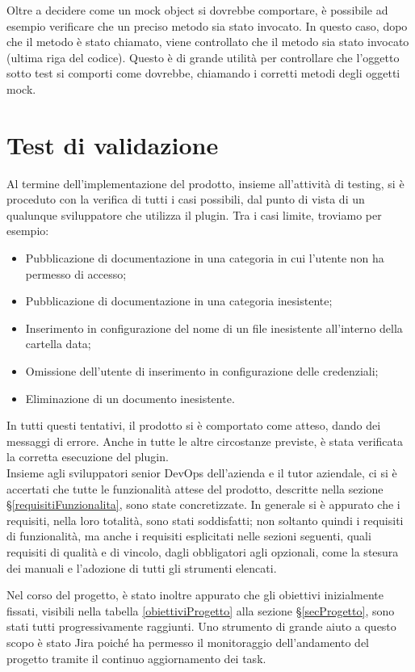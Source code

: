     Oltre a decidere come un mock object si dovrebbe comportare, è possibile ad esempio verificare che un preciso metodo sia stato invocato.
    In questo caso, dopo che il metodo  è stato chiamato, viene controllato che il metodo  sia stato invocato (ultima riga del codice).
    Questo è di grande utilità per controllare che l'oggetto sotto test si comporti come dovrebbe, chiamando i corretti metodi degli oggetti mock.


\section{Test di validazione}
Al termine dell'implementazione del prodotto, insieme all'attività di testing, si è proceduto con la verifica di tutti i casi possibili, dal punto di vista di un qualunque sviluppatore che utilizza il plugin.
Tra i casi limite, troviamo per esempio:
\begin{itemize}
    \item Pubblicazione di documentazione in una categoria in cui l'utente non ha permesso di accesso;
    \item Pubblicazione di documentazione in una categoria inesistente;
    \item Inserimento in configurazione del nome di un file inesistente all'interno della cartella data;
    \item Omissione dell'utente di inserimento in configurazione delle credenziali;
    \item Eliminazione di un documento inesistente.
\end{itemize}
In tutti questi tentativi, il prodotto si è comportato come atteso, dando dei messaggi di errore.
Anche in tutte le altre circostanze previste, è stata verificata la corretta esecuzione del plugin. \\

Insieme agli sviluppatori senior DevOps dell'azienda e il tutor aziendale, ci si è accertati che tutte le funzionalità attese del prodotto, descritte nella sezione \S\ref{requisitiFunzionalita}, sono state concretizzate.
In generale si è appurato che i requisiti, nella loro totalità, sono stati soddisfatti; non soltanto quindi i requisiti di funzionalità, ma anche i requisiti esplicitati nelle sezioni seguenti, quali requisiti di qualità e di vincolo, dagli obbligatori agli opzionali, come la stesura dei manuali e l'adozione di tutti gli strumenti elencati.

Nel corso del progetto, è stato inoltre appurato che gli obiettivi inizialmente fissati, visibili nella tabella \ref{obiettiviProgetto} alla sezione \S\ref{secProgetto}, sono stati tutti progressivamente raggiunti.
Uno strumento di grande aiuto a questo scopo è stato Jira poiché ha permesso il monitoraggio dell'andamento del progetto tramite il continuo aggiornamento dei task.


